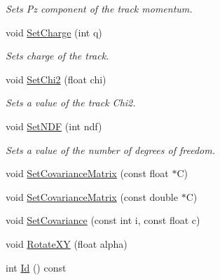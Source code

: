 \begin{DoxyCompactItemize}
\begin{DoxyCompactList}\small\item\em Sets Pz component of the track momentum. \end{DoxyCompactList}\item 
void \hyperlink{classKFPTrack_af0916c90726a14f3976c70452a5292a9}{Set\+Charge} (int q)\hypertarget{classKFPTrack_af0916c90726a14f3976c70452a5292a9}{}\label{classKFPTrack_af0916c90726a14f3976c70452a5292a9}

\begin{DoxyCompactList}\small\item\em Sets charge of the track. \end{DoxyCompactList}\item 
void \hyperlink{classKFPTrack_a1159ffc107e5df082590f0777f30fea8}{Set\+Chi2} (float chi)\hypertarget{classKFPTrack_a1159ffc107e5df082590f0777f30fea8}{}\label{classKFPTrack_a1159ffc107e5df082590f0777f30fea8}

\begin{DoxyCompactList}\small\item\em Sets a value of the track Chi2. \end{DoxyCompactList}\item 
void \hyperlink{classKFPTrack_aafb79cf24a433a293f05c2c3336d0d21}{Set\+N\+DF} (int ndf)\hypertarget{classKFPTrack_aafb79cf24a433a293f05c2c3336d0d21}{}\label{classKFPTrack_aafb79cf24a433a293f05c2c3336d0d21}

\begin{DoxyCompactList}\small\item\em Sets a value of the number of degrees of freedom. \end{DoxyCompactList}\item 
void \hyperlink{classKFPTrack_a105dc3b9dc17e979cc782492458ab88a}{Set\+Covariance\+Matrix} (const float $\ast$C)
\item 
void \hyperlink{classKFPTrack_a9b25532afa0f49ebfcedce044f74c349}{Set\+Covariance\+Matrix} (const double $\ast$C)
\item 
void \hyperlink{classKFPTrack_a1a524473353d515086af621107dea2fe}{Set\+Covariance} (const int i, const float c)
\item 
void \hyperlink{classKFPTrack_a3d9a9456222119b926cce3886bf15161}{Rotate\+XY} (float alpha)
\item 
int \hyperlink{classKFPTrack_a5ac4370d9be316566f3ef2e27edc9444}{Id} () const \hypertarget{classKFPTrack_a5ac4370d9be316566f3ef2e27edc9444}{}\label{classKFPTrack_a5ac4370d9be316566f3ef2e27edc9444}


\end{DoxyCompactItemize}

